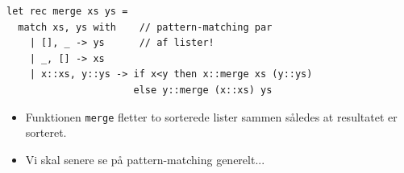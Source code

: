 \documentclass[rgb]{beamer}
\begin{document}
\begin{frame}[fragile]
\begin{footnotesize}

\vspace{1ex}

\begin{lstlisting}[numbers=none,frame=none,mathescape]
let rec merge xs ys =
  match xs, ys with    // pattern-matching par
    | [], _ -> ys      // af lister!
    | _, [] -> xs
    | x::xs, y::ys -> if x<y then x::merge xs (y::ys)
                      else y::merge (x::xs) ys
\end{lstlisting}

\begin{itemize}
\item Funktionen \lstinline{merge} fletter to sorterede lister sammen således at resultatet er sorteret.
\item Vi skal senere se på pattern-matching generelt...
\end{itemize}

\end{footnotesize}
\end{frame}
\end{document}
